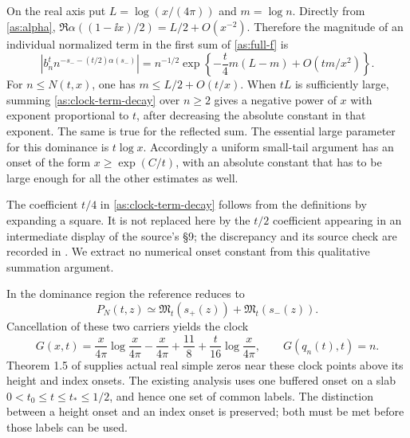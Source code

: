On the real axis put $L=\log(x/(4\pi))$ and $m=\log n$.
Directly from \eqref{as:alpha},
$\Re\alpha((1-\ii x)/2)=L/2+O(x^{-2})$.  Therefore the magnitude of
an individual normalized term in the first sum of \eqref{as:full-f} is
\begin{equation}
 \left|b_n^t n^{-s_--(t/2)\alpha(s_-)}\right|
   =n^{-1/2}
      \exp\left\{-\frac{t}{4}m(L-m)+O(tm/x^2)\right\}.
 \label{as:clock-term-decay}
\end{equation}
For $n\le N(t,x)$, one has
$m\le L/2+O(t/x)$.  When $tL$ is sufficiently large, summing
\eqref{as:clock-term-decay} over $n\ge2$ gives a negative power of
$x$ with exponent proportional to $t$, after decreasing the absolute
constant in that exponent.  The same is true for the reflected sum.
The essential large parameter for this dominance is $t\log x$.
Accordingly a uniform small-tail argument has an onset of the form
$x\ge\exp(C/t)$, with an absolute constant that has to be large enough
for all the other estimates as well.

The coefficient $t/4$ in \eqref{as:clock-term-decay} follows from the
definitions by expanding a square.  It is not replaced here by the
$t/2$ coefficient appearing in an intermediate display of the source's
\S9; the discrepancy and its source check are recorded in
\cite{VCDCMDiscussion11}.  We extract no numerical onset constant from
this qualitative summation argument.

In the dominance region the reference reduces to
\begin{equation}
 P_N(t,z)\simeq\mathfrak M_t(s_+(z))+
                      \mathfrak M_t(s_-(z)).
 \label{as:two-carriers}
\end{equation}
Cancellation of these two carriers yields the clock
\begin{equation}
 G(x,t)=\frac{x}{4\pi}\log\frac{x}{4\pi}
       -\frac{x}{4\pi}+\frac{11}{8}
       +\frac{t}{16}\log\frac{x}{4\pi},\qquad
 G(q_n(t),t)=n.
 \label{as:clock}
\end{equation}
Theorem 1.5 of \cite{Polymath2019} supplies actual real simple zeros
near these clock points above its height and index onsets.  The existing
analysis \cite{VCDCMManuscript} uses one buffered onset on a slab
$0<t_0\le t\le t_*\le1/2$, and hence one set of common labels.
The distinction between a height onset and an index onset is preserved;
both must be met before those labels can be used.

